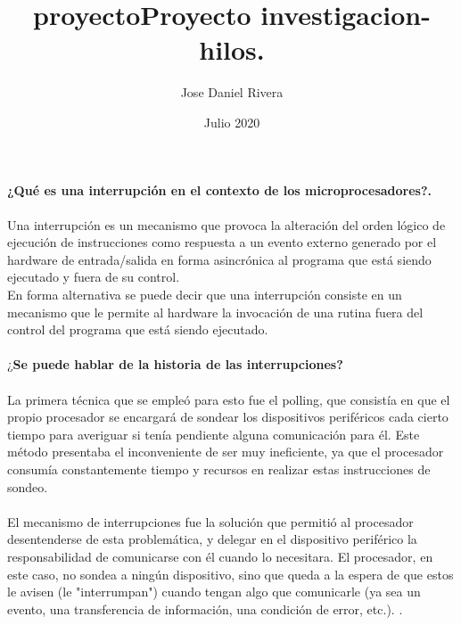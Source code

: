 \documentclass[12pt]{article}
\title{proyecto}
\author{Jose Daniel Rivera }
\date{Julio 2020}
\begin{document}
\title{Proyecto investigacion-hilos. \\}

\maketitle

\noindent
\textbf{¿Qué es una interrupción en el contexto de los microprocesadores?.}
\\
\noindent
\\
Una interrupción es un mecanismo que provoca la alteración del orden lógico de ejecución de instrucciones como respuesta a un evento externo generado por el hardware de entrada/salida en forma asincrónica al programa que está siendo ejecutado y fuera de su control.\\
En forma alternativa se puede decir que una interrupción consiste en un mecanismo que le permite al hardware la invocación de una rutina fuera del control del programa que está siendo ejecutado. \\
\noindent
\\
\textbf{}¿\textbf{Se puede hablar de la historia de las interrupciones?}\\
\noindent
\\
La primera técnica que se empleó para esto fue el polling, que consistía en que el propio procesador se encargará de sondear los dispositivos periféricos cada cierto tiempo para averiguar si tenía pendiente alguna comunicación para él. Este método presentaba el inconveniente de ser muy ineficiente, ya que el procesador consumía constantemente tiempo y recursos en realizar estas instrucciones de sondeo.\cite{elizaldeinterrupciones0}\\
\\
El mecanismo de interrupciones fue la solución que permitió al procesador desentenderse de esta problemática, y delegar en el dispositivo periférico la responsabilidad de comunicarse con él cuando lo necesitara. El procesador, en este caso, no sondea a ningún dispositivo, sino que queda a la espera de que estos le avisen (le "interrumpan") cuando tengan algo que comunicarle (ya sea un evento, una transferencia de información, una condición de error, etc.).
. \cite{lopezfundamentos2010}
\end{document}
